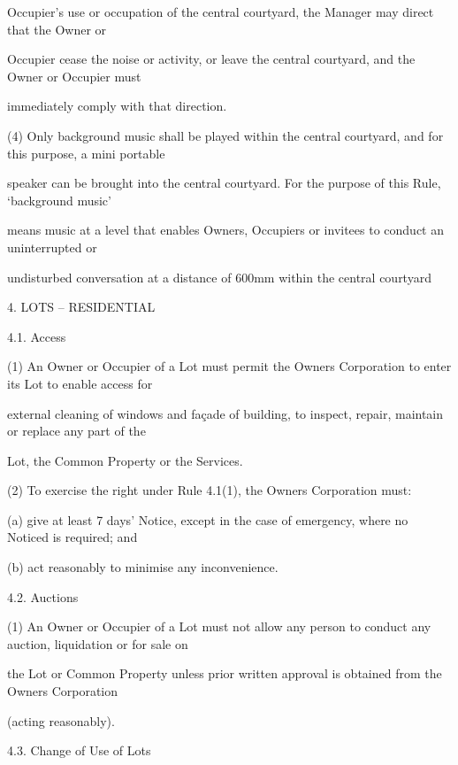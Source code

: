 \documentclass{article}
\begin{document}
{\fontsize{10.02}{1}Occupier’s use or occupation of the central courtyard, the Manager may direct that the Owner or }

{\fontsize{10.02}{1}Occupier cease the noise or activity, or leave the central courtyard, and the Owner or Occupier must }

{\fontsize{10.02}{1}immediately comply with that direction. }

{\fontsize{9.962}{1}(4) Only background music shall be played within the central courtyard, and for this purpose, a mini portable }

{\fontsize{10.02}{1}speaker can be brought into the central courtyard. For the purpose of this Rule, ‘background music’ }

{\fontsize{10.02}{1}means music at a level that enables Owners, Occupiers or invitees to conduct an uninterrupted or }

{\fontsize{10.02}{1}undisturbed conversation at a distance of 600mm within the central courtyard  }


{\fontsize{9.99}{1}4. LOTS – RESIDENTIAL }

{\fontsize{9.99}{1}4.1. Access }

{\fontsize{9.962}{1}(1) An Owner or Occupier of a Lot must permit the Owners Corporation to enter its Lot to enable access for }

{\fontsize{10.02}{1}external cleaning of windows and façade of building, to inspect, repair, maintain or replace any part of the }

{\fontsize{10.02}{1}Lot, the Common Property or the Services. }

{\fontsize{9.962}{1}(2) To exercise the right under Rule 4.1(1), the Owners Corporation must: }


{\fontsize{9.962}{1}(a) give at least 7 days’ Notice, except in the case of emergency, where no Noticed is required; and }

{\fontsize{9.962}{1}(b) act reasonably to minimise any inconvenience. }

{\fontsize{9.99}{1}4.2. Auctions }

{\fontsize{9.962}{1}(1) An Owner or Occupier of a Lot must not allow any person to conduct any auction, liquidation or for sale on }

{\fontsize{10.02}{1}the Lot or Common Property unless prior written approval is obtained from the Owners Corporation }

{\fontsize{10.02}{1}(acting reasonably). }

{\fontsize{9.99}{1}4.3. Change of Use of Lots }
\end{document}
